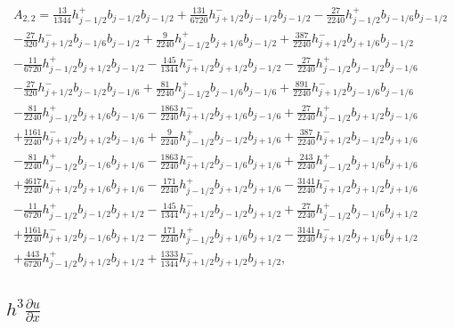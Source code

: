 \documentclass[12pt]{article}
\begin{document}
\begin{multline*} A_{2,2} = \frac{13}{1344} h_{j-1/2}^+ b_{j-1/2} b_{j-1/2}+\frac{131}{6720} h_{j+1/2}^- b_{j-1/2} b_{j-1/2}-\frac{27}{2240} h_{j-1/2}^+ b_{j-1/6} b_{j-1/2}\\-\frac{27}{320} h_{j+1/2}^- b_{j-1/6} b_{j-1/2}+\frac{9}{2240} h_{j-1/2}^+ b_{j+1/6} b_{j-1/2}+\frac{387}{2240} h_{j+1/2}^- b_{j+1/6} b_{j-1/2}\\-\frac{11}{6720} h_{j-1/2}^+ b_{j+1/2} b_{j-1/2}-\frac{145}{1344} h_{j+1/2}^- b_{j+1/2} b_{j-1/2}-\frac{27}{2240} h_{j-1/2}^+ b_{j-1/2} b_{j-1/6}\\-\frac{27}{320} h_{j+1/2}^- b_{j-1/2} b_{j-1/6}+\frac{81}{2240} h_{j-1/2}^+ b_{j-1/6} b_{j-1/6}+\frac{891}{2240} h_{j+1/2}^- b_{j-1/6} b_{j-1/6}\\-\frac{81}{2240} h_{j-1/2}^+ b_{j+1/6} b_{j-1/6}-\frac{1863}{2240} h_{j+1/2}^- b_{j+1/6} b_{j-1/6}+\frac{27}{2240} h_{j-1/2}^+ b_{j+1/2} b_{j-1/6}\\+\frac{1161}{2240} h_{j+1/2}^- b_{j+1/2} b_{j-1/6}+\frac{9}{2240} h_{j-1/2}^+ b_{j-1/2} b_{j+1/6}+\frac{387}{2240} h_{j+1/2}^- b_{j-1/2} b_{j+1/6}\\-\frac{81}{2240} h_{j-1/2}^+ b_{j-1/6} b_{j+1/6}-\frac{1863}{2240} h_{j+1/2}^- b_{j-1/6} b_{j+1/6}+\frac{243}{2240} h_{j-1/2}^+ b_{j+1/6} b_{j+1/6}\\+\frac{4617}{2240} h_{j+1/2}^- b_{j+1/6} b_{j+1/6}-\frac{171}{2240} h_{j-1/2}^+ b_{j+1/2} b_{j+1/6}-\frac{3141}{2240} h_{j+1/2}^- b_{j+1/2} b_{j+1/6}\\-\frac{11}{6720} h_{j-1/2}^+ b_{j-1/2} b_{j+1/2}-\frac{145}{1344} h_{j+1/2}^- b_{j-1/2} b_{j+1/2}+\frac{27}{2240} h_{j-1/2}^+ b_{j-1/6} b_{j+1/2}\\+\frac{1161}{2240} h_{j+1/2}^- b_{j-1/6} b_{j+1/2}-\frac{171}{2240} h_{j-1/2}^+ b_{j+1/6} b_{j+1/2}-\frac{3141}{2240} h_{j+1/2}^- b_{j+1/6} b_{j+1/2}\\+\frac{443}{6720} h_{j-1/2}^+ b_{j+1/2} b_{j+1/2}+\frac{1333}{1344} h_{j+1/2}^- b_{j+1/2} b_{j+1/2}, \end{multline*}

\subsection{$h^3 \frac{\partial u}{\partial x}$}
\end{document}
